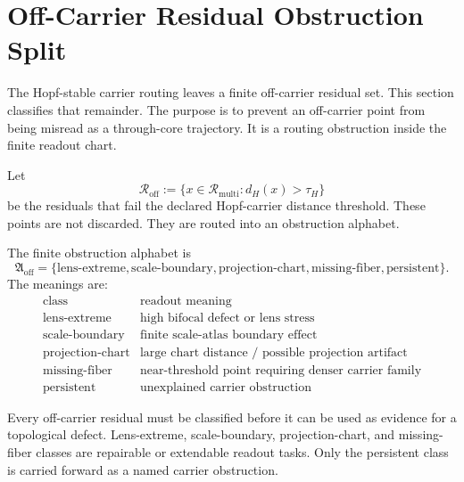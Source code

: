 
\section{Off-Carrier Residual Obstruction Split}
\label{sec:off-carrier-residual-obstruction-split}

The Hopf-stable carrier routing leaves a finite off-carrier residual set.  This
section classifies that remainder.  The purpose is to prevent an off-carrier
point from being misread as a through-core trajectory.  It is a routing
obstruction inside the finite readout chart.

\begin{definition}
Let
\[
    \mathcal R_{\mathrm{off}}
    :=
    \{x\in\mathcal R_{\mathrm{multi}}: d_H(x)>\tau_H\}
\]
be the residuals that fail the declared Hopf-carrier distance threshold.  These
points are not discarded.  They are routed into an obstruction alphabet.
\end{definition}

\begin{definition}
The finite obstruction alphabet is
\[
    \mathfrak A_{\mathrm{off}}
    =
    \{\mathrm{lens\text{-}extreme},
      \mathrm{scale\text{-}boundary},
      \mathrm{projection\text{-}chart},
      \mathrm{missing\text{-}fiber},
      \mathrm{persistent}\}.
\]
The meanings are:
\[
\begin{array}{c|l}
\text{class} & \text{readout meaning}\\
\hline
\mathrm{lens\text{-}extreme} & \text{high bifocal defect or lens stress}\\
\mathrm{scale\text{-}boundary} & \text{finite scale-atlas boundary effect}\\
\mathrm{projection\text{-}chart} & \text{large chart distance / possible projection artifact}\\
\mathrm{missing\text{-}fiber} & \text{near-threshold point requiring denser carrier family}\\
\mathrm{persistent} & \text{unexplained carrier obstruction}
\end{array}
\]
\end{definition}

\begin{proposition}
Every off-carrier residual must be classified before it can be used as
evidence for a topological defect.  Lens-extreme, scale-boundary,
projection-chart, and missing-fiber classes are repairable or extendable
readout tasks.  Only the persistent class is carried forward as a named carrier
obstruction.
\end{proposition}

